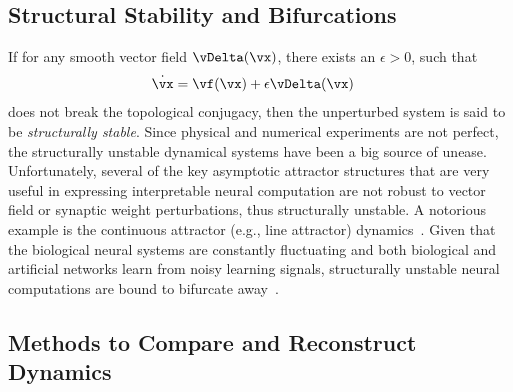 \documentclass{article}
\theoremstyle{definition} \newtheorem{definition}{Definition}  \newtheorem{example}{Example}
\theoremstyle{remark} \newtheorem{remark}{Remark}
\newcounter{ct}
\begin{document}
\subsection{Structural Stability and Bifurcations}
If for any smooth vector field $\vDelta(\vx)$, there exists an $\epsilon > 0$, such that
\begin{align}\label{eq:vfp:epsilon}
\dot{\vx} &= \vf(\vx) + \epsilon\vDelta(\vx)
\end{align}
does not break the topological conjugacy, then the unperturbed system is said to be \emph{structurally stable}.
Since physical and numerical experiments are not perfect, the structurally unstable dynamical systems have been a big source of unease. %
Unfortunately, several of the key asymptotic attractor structures that are very useful in expressing interpretable neural computation are not robust to vector field or synaptic weight perturbations, thus structurally unstable.
A notorious example is the continuous attractor (e.g., line attractor) dynamics~\citep{Sagodi2024a}.
Given that the biological neural systems are constantly fluctuating and both biological and artificial networks learn from noisy learning signals, structurally unstable neural computations are bound to bifurcate away~\citep{Park2023a}.

%
\subsection{Methods to Compare and Reconstruct Dynamics}\label{sec:comparison}
\end{document}
